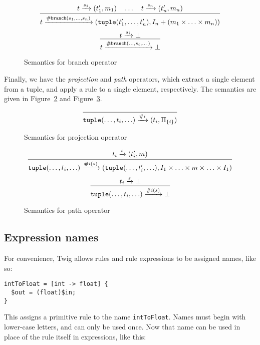 \begin{figure}[ht]
\label{fig:branch}
\[
\infer
  {t \arr{\mathtt{\#branch}(s_1,\ldots,s_n)} (\mathtt{tuple}(t_1',\ldots,t_n'),I_n + (m_1 \times \ldots \times m_n))}
  {t \arr{s_1} (t_1',m_1) \quad \ldots \quad t \arr{s_n} (t_n',m_n)}
\]
\[
\infer
  {t \arr{\mathtt{\#branch}(\ldots,s_i,\dots)} \bot}
  {t \arr{s_i} \bot}
\]
\caption{Semantics for branch operator}
\end{figure}

Finally, we have the \emph{projection} and \emph{path} operators, which extract a single element from a tuple, and apply a rule to a single element, respectively. The semantics are given in Figure~\ref{fig:projection} and Figure~\ref{fig:path}.

\begin{figure}[ht]
\label{fig:projection}
\[
\infer
  {\mathtt{tuple}(\ldots,t_i,\ldots) \arr{\#i} (t_i,\Pi_{\{i\}})}
  {}
\]
\caption{Semantics for projection operator}
\end{figure}


\begin{figure}[ht]
\label{fig:path}
\[
\infer
  {\mathtt{tuple}(\ldots,t_i,\ldots) \arr{\#i(s)} (\mathtt{tuple}(\ldots,t_i',\ldots), I_1 \times \ldots \times m \times \ldots \times I_1)}
  {t_i \arr{s} (t_i',m)}
\]
\[
\infer
  {\mathtt{tuple}(\ldots,t_i,\ldots) \arr{\#i(s)} \bot}
  {t_i \arr{s} \bot}
\]
\caption{Semantics for path operator}
\end{figure}


\subsection{Expression names}
\label{section:names}

For convenience, Twig allows rules and rule expressions to be assigned names, like so:

\begin{verbatim}
intToFloat = [int -> float] {
  $out = (float)$in;
}
\end{verbatim}

This assigns a primitive rule to the name \texttt{intToFloat}. Names must begin with lower-case letters, and can only be used once. Now that name can be used in place of the rule itself in expressions, like this:

